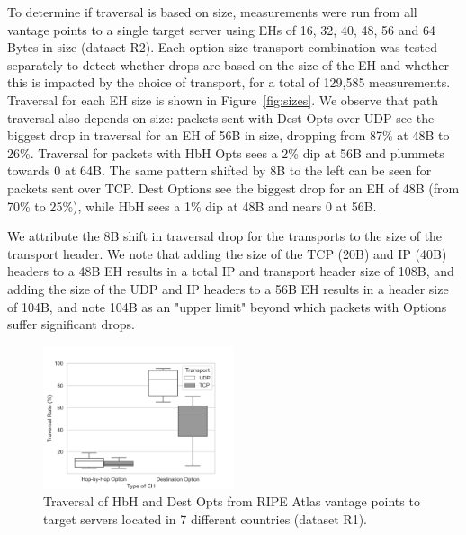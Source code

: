 \documentclass[conference]{IEEEtran}
\begin{document}
To determine if traversal is based on size, measurements were run from all vantage points to a single target server using EHs of 16, 32, 40, 48, 56 and 64 Bytes in size (dataset R2). Each option-size-transport combination was tested separately to detect whether drops are based on the size of the EH and whether this is impacted by the choice of transport, for a total of 129,585 measurements.
Traversal for each EH size is shown in Figure~\ref{fig:sizes}. We observe that path traversal also depends on size: packets sent with Dest Opts over UDP see the biggest drop in traversal for an EH of 56B in size, dropping from 87\% at 48B to 26\%. Traversal for packets with HbH Opts sees a 2\% dip at 56B and plummets towards 0 at 64B.
The same pattern shifted by 8B to the left can be seen for packets sent over TCP. Dest Options see the biggest drop for an EH of 48B (from 70\% to 25\%), while HbH sees a 1\% dip at 48B and nears 0 at 56B.

We attribute the 8B shift in traversal drop for the transports to the size of the transport header.
We note that adding the size of the TCP (20B) and IP (40B) headers to a 48B EH results in a total IP and transport header size of 108B, and adding the size of the UDP and IP headers to a 56B EH results in a header size of 104B, and note 104B as an "upper limit" beyond which packets with Options suffer significant drops.

\begin{figure}
\centering
  \includegraphics[width=0.5\textwidth]{all_traversal.png}
  \caption{Traversal of HbH and Dest Opts from RIPE Atlas vantage points to target servers located in 7 different countries (dataset R1). }
  \label{fig:countrybox}
\end{figure}
\end{document}
